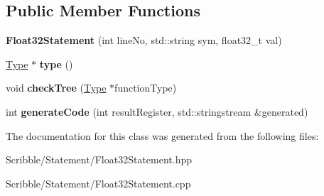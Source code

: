 \subsection*{Public Member Functions}
\begin{DoxyCompactItemize}
\item 
\hypertarget{class_float32_statement_a14d11ddddd16bed63dfd6d90623e262a}{{\bfseries Float32\-Statement} (int line\-No, std\-::string sym, float32\-\_\-t val)}\label{class_float32_statement_a14d11ddddd16bed63dfd6d90623e262a}

\item 
\hypertarget{class_float32_statement_a6e9420f9ce65218ca8d8293a0073936f}{\hyperlink{class_type}{Type} $\ast$ {\bfseries type} ()}\label{class_float32_statement_a6e9420f9ce65218ca8d8293a0073936f}

\item 
\hypertarget{class_float32_statement_ae08e43873e2864e49b5513023aa91c2d}{void {\bfseries check\-Tree} (\hyperlink{class_type}{Type} $\ast$function\-Type)}\label{class_float32_statement_ae08e43873e2864e49b5513023aa91c2d}

\item 
\hypertarget{class_float32_statement_aab851a7a1542e16128077eedfbea8304}{int {\bfseries generate\-Code} (int result\-Register, std\-::stringstream \&generated)}\label{class_float32_statement_aab851a7a1542e16128077eedfbea8304}

\end{DoxyCompactItemize}


The documentation for this class was generated from the following files\-:\begin{DoxyCompactItemize}
\item 
Scribble/\-Statement/Float32\-Statement.\-hpp\item 
Scribble/\-Statement/Float32\-Statement.\-cpp\end{DoxyCompactItemize}
